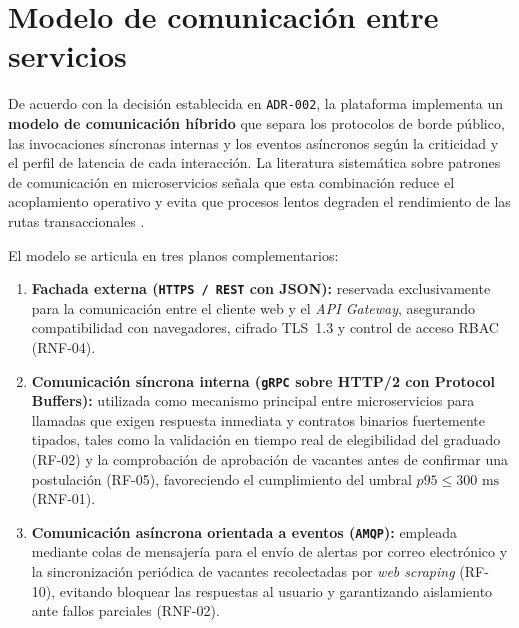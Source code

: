 \documentclass[11pt,a4paper]{article}
\begin{document}
\section{Modelo de comunicación entre servicios}

De acuerdo con la decisión establecida en \texttt{ADR-002}, la plataforma implementa un \textbf{modelo de comunicación híbrido} que separa los protocolos de borde público, las invocaciones síncronas internas y los eventos asíncronos según la criticidad y el perfil de latencia de cada interacción. La literatura sistemática sobre patrones de comunicación en microservicios señala que esta combinación reduce el acoplamiento operativo y evita que procesos lentos degraden el rendimiento de las rutas transaccionales \cite{aksakalli2021,waseem2021}.

El modelo se articula en tres planos complementarios:
\begin{enumerate}
    \item \textbf{Fachada externa (\texttt{HTTPS / REST} con JSON):} reservada exclusivamente para la comunicación entre el cliente web y el \textit{API Gateway}, asegurando compatibilidad con navegadores, cifrado TLS~1.3 y control de acceso RBAC (RNF-04).
    \item \textbf{Comunicación síncrona interna (\texttt{gRPC} sobre HTTP/2 con Protocol Buffers):} utilizada como mecanismo principal entre microservicios para llamadas que exigen respuesta inmediata y contratos binarios fuertemente tipados, tales como la validación en tiempo real de elegibilidad del graduado (RF-02) y la comprobación de aprobación de vacantes antes de confirmar una postulación (RF-05), favoreciendo el cumplimiento del umbral $p95 \le 300\text{ ms}$ (RNF-01).
    \item \textbf{Comunicación asíncrona orientada a eventos (\texttt{AMQP}):} empleada mediante colas de mensajería para el envío de alertas por correo electrónico y la sincronización periódica de vacantes recolectadas por \textit{web scraping} (RF-10), evitando bloquear las respuestas al usuario y garantizando aislamiento ante fallos parciales (RNF-02).
\end{enumerate}
\end{document}
